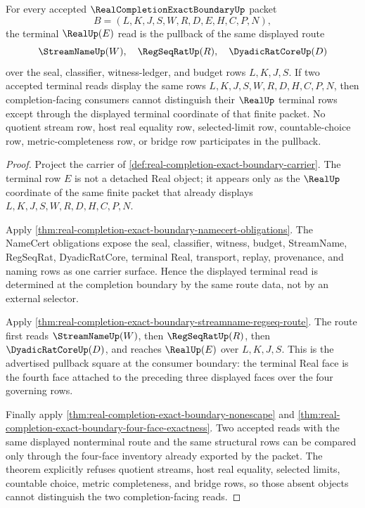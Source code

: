 \begin{theorem}
\label{thm:real-completion-exact-boundary-terminal-route-pullback}
For every accepted $\RealCompletionExactBoundaryUp$ packet
$$
B=(L,K,J,S,W,R,D,E,H,C,P,N),
$$
the terminal $\RealUp(E)$ read is the pullback of the same displayed route
$$
\StreamNameUp(W),\quad \RegSeqRatUp(R),\quad \DyadicRatCoreUp(D)
$$
over the seal, classifier, witness-ledger, and budget rows $L,K,J,S$. If two accepted terminal reads display the same rows $L,K,J,S,W,R,D,H,C,P,N$, then completion-facing consumers cannot distinguish their $\RealUp$ terminal rows except through the displayed terminal coordinate of that finite packet. No quotient stream row, host real equality row, selected-limit row, countable-choice row, metric-completeness row, or bridge row participates in the pullback.
\end{theorem}
\begin{proof}
Project the carrier of \autoref{def:real-completion-exact-boundary-carrier}. The terminal row $E$ is not a detached Real object; it appears only as the $\RealUp$ coordinate of the same finite packet that already displays $L,K,J,S,W,R,D,H,C,P,N$.

Apply \autoref{thm:real-completion-exact-boundary-namecert-obligations}. The NameCert obligations expose the seal, classifier, witness, budget, StreamName, RegSeqRat, DyadicRatCore, terminal Real, transport, replay, provenance, and naming rows as one carrier surface. Hence the displayed terminal read is determined at the completion boundary by the same route data, not by an external selector.

Apply \autoref{thm:real-completion-exact-boundary-streamname-regseq-route}. The route first reads $\StreamNameUp(W)$, then $\RegSeqRatUp(R)$, then $\DyadicRatCoreUp(D)$, and reaches $\RealUp(E)$ over $L,K,J,S$. This is the advertised pullback square at the consumer boundary: the terminal Real face is the fourth face attached to the preceding three displayed faces over the four governing rows.

Finally apply \autoref{thm:real-completion-exact-boundary-nonescape} and \autoref{thm:real-completion-exact-boundary-four-face-exactness}. Two accepted reads with the same displayed nonterminal route and the same structural rows can be compared only through the four-face inventory already exported by the packet. The theorem explicitly refuses quotient streams, host real equality, selected limits, countable choice, metric completeness, and bridge rows, so those absent objects cannot distinguish the two completion-facing reads.
\end{proof}

